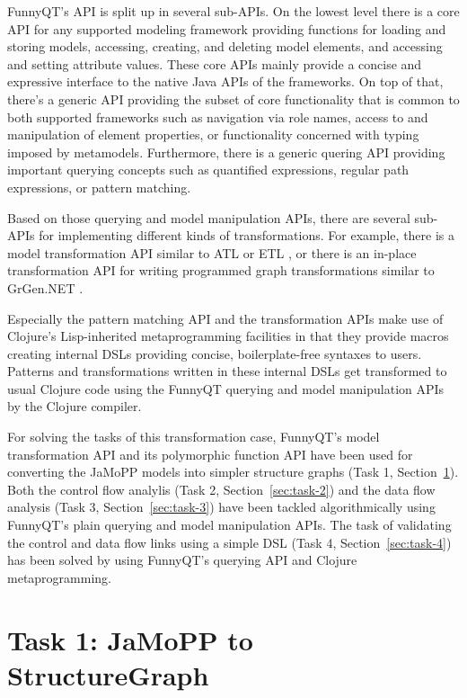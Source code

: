 \documentclass[11pt]{article}
\begin{document}
FunnyQT's API is split up in several sub-APIs.  On the lowest level there is a
core API for any supported modeling framework providing functions for loading
and storing models, accessing, creating, and deleting model elements, and
accessing and setting attribute values.  These core APIs mainly provide a
concise and expressive interface to the native Java APIs of the frameworks.  On
top of that, there's a generic API providing the subset of core functionality
that is common to both supported frameworks such as navigation via role names,
access to and manipulation of element properties, or functionality concerned
with typing imposed by metamodels.  Furthermore, there is a generic quering API
providing important querying concepts such as quantified expressions, regular
path expressions, or pattern matching.

Based on those querying and model manipulation APIs, there are several sub-APIs
for implementing different kinds of transformations.  For example, there is a
model transformation API similar to ATL \cite{ATL05} or ETL
\cite{booklet:epsilon}, or there is an in-place transformation API for writing
programmed graph transformations similar to GrGen.NET
\cite{manual:GrGenManual}.

Especially the pattern matching API and the transformation APIs make use of
Clojure's Lisp-inherited metaprogramming facilities
\cite{Graham1993OnLisp,Hoyte08LoL} in that they provide macros creating
internal DSLs \cite{book:Fowler2010DSL} providing concise, boilerplate-free
syntaxes to users.  Patterns and transformations written in these internal DSLs
get transformed to usual Clojure code using the FunnyQT querying and model
manipulation APIs by the Clojure compiler.

For solving the tasks of this transformation case, FunnyQT's model
transformation API and its polymorphic function API have been used for
converting the JaMoPP models into simpler structure graphs (Task 1,
Section~\ref{sec:task-1}).  Both the control flow analylis (Task 2,
Section~\ref{sec:task-2}) and the data flow analysis (Task 3,
Section~\ref{sec:task-3}) have been tackled algorithmically using FunnyQT's
plain querying and model manipulation APIs.  The task of validating the control
and data flow links using a simple DSL (Task 4, Section~\ref{sec:task-4}) has
been solved by using FunnyQT's querying API and Clojure metaprogramming.


\section{Task 1: JaMoPP to StructureGraph}
\label{sec:task-1}
\end{document}
